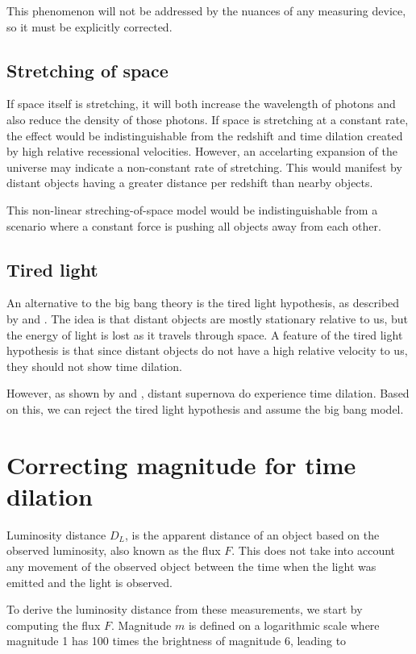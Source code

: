 \documentclass{article}
\begin{document}
This phenomenon will not be addressed by the nuances of any measuring device,
so it must be explicitly corrected.

\subsection{Stretching of space}

If space itself is stretching, it will both increase the wavelength of photons
and also reduce the density of those photons. If space is stretching at a
constant rate, the effect would be indistinguishable from the redshift and time
dilation created by high relative recessional velocities. However, an
accelarting expansion of the universe may indicate a non-constant rate of
stretching. This would manifest by distant objects having a greater distance
per redshift than nearby objects.

This non-linear streching-of-space model would be indistinguishable from a
scenario where a constant force is pushing all objects away from each other.

\subsection{Tired light}

An alternative to the big bang theory is the tired light hypothesis, as
described by \citet{zwicky1929} and \citet{shao2013}. The idea is that distant
objects are mostly stationary relative to us, but the energy of light is lost
as it travels through space. A feature of the tired light hypothesis is that
since distant objects do not have a high relative velocity to us, they should
not show time dilation.

However, as shown by \citet{blonden2008} and \citet{white2024}, distant
supernova do experience time dilation. Based on this, we can reject the tired
light hypothesis and assume the big bang model.

\section{Correcting magnitude for time dilation}

Luminosity distance $D_L$, is the apparent distance of an object based on the
observed luminosity, also known as the flux $F$. This does not take into
account any movement of the observed object between the time when the light was
emitted and the light is observed.

To derive the luminosity distance from these measurements, we start
by computing the flux $F$. Magnitude $m$ is defined on a logarithmic scale
where magnitude 1 has 100 times the brightness of magnitude 6, leading to
\end{document}
